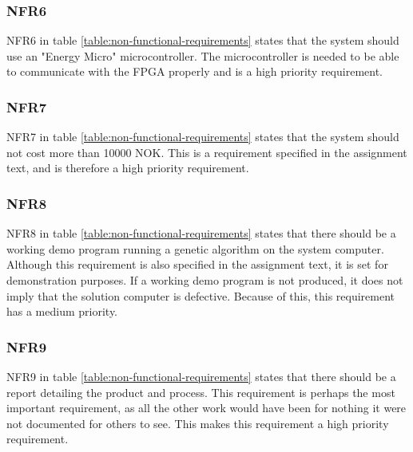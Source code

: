 \subsubsection{NFR6}

NFR6 in table \vref{table:non-functional-requirements} states that the system should use an "Energy Micro" microcontroller.
The microcontroller is needed to be able to communicate with the FPGA properly and is a high priority requirement.

\subsubsection{NFR7}

NFR7 in table \vref{table:non-functional-requirements} states that the system should not cost more than 10000 NOK.
This is a requirement specified in the assignment text, and is therefore a high priority requirement.

\subsubsection{NFR8}

NFR8 in table \vref{table:non-functional-requirements} states that there should be a working demo program running a genetic algorithm on the system computer.
Although this requirement is also specified in the assignment text, it is set for demonstration purposes.
If a working demo program is not produced, it does not imply that the solution computer is defective.
Because of this, this requirement has a medium priority.

\subsubsection{NFR9}

NFR9 in table \vref{table:non-functional-requirements} states that there should be a report detailing the product and process.
This requirement is perhaps the most important requirement, as all the other work would have been for nothing it were not documented for others to see.
This makes this requirement a high priority requirement.
